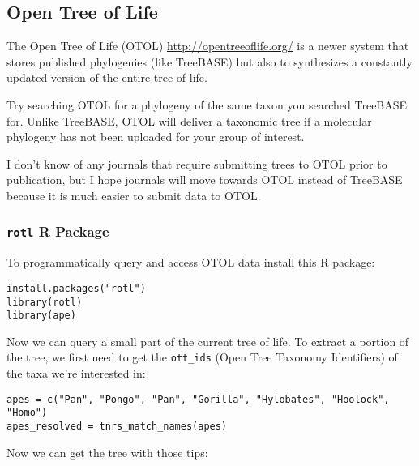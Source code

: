 \documentclass[11pt]{article}
\begin{document}
%


\subsection{Open Tree of Life}

The Open Tree of Life (OTOL) \url{http://opentreeoflife.org/}
is a newer system that stores published phylogenies (like TreeBASE)
but also to synthesizes a constantly updated version of the entire tree of life.

Try searching OTOL for a phylogeny of the same taxon you searched TreeBASE for.
Unlike TreeBASE, OTOL will deliver a taxonomic tree if a molecular phylogeny 
has not been uploaded for your group of interest.

I don't know of any journals that require submitting trees to OTOL
prior to publication, but I hope journals will move towards OTOL instead
of TreeBASE because it is much easier to submit data to OTOL.

\subsubsection{\texttt{rotl} R Package}

To programmatically query and access OTOL data install this R package:

\begin{verbatim}
install.packages("rotl")
library(rotl)
library(ape)
\end{verbatim}

Now we can query a small part of the current tree of life.
To extract a portion of the tree, we first need to
get the \texttt{ott\_ids} (Open Tree Taxonomy Identifiers)
of the taxa we're interested in:

\begin{verbatim}
apes = c("Pan", "Pongo", "Pan", "Gorilla", "Hylobates", "Hoolock", "Homo")
apes_resolved = tnrs_match_names(apes)
\end{verbatim}

Now we can get the tree with those tips:
\end{document}
